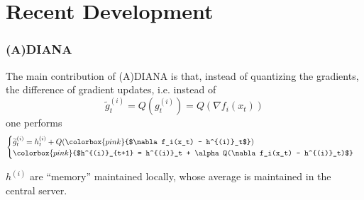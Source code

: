 
\section{Recent Development}


\begin{frame}
\frametitle{(A)DIANA}

The main contribution of (A)DIANA \cite{lizhize2020adiana,mishchenko2019diana} is that, instead of quantizing the gradients, the {\color{red} difference of gradient updates}, i.e. instead of
$$\widetilde{g}^{(i)}_t = Q(g^{(i)}_t) = Q(\nabla f_i(x_t))$$
one performs
\begin{equation*}
    \begin{cases}
    \widetilde{g}^{(i)}_t = h^{(i)}_t + Q(\colorbox{pink}{$\nabla f_i(x_t) - h^{(i)}_t$}) \\
    \colorbox{pink}{$h^{(i)}_{t+1} = h^{(i)}_t + \alpha Q(\nabla f_i(x_t) - h^{(i)}_t)$}
    \end{cases}
\end{equation*}

$h^{(i)}$ are ``memory'' maintained locally, whose average is maintained in the central server.


\end{frame}


